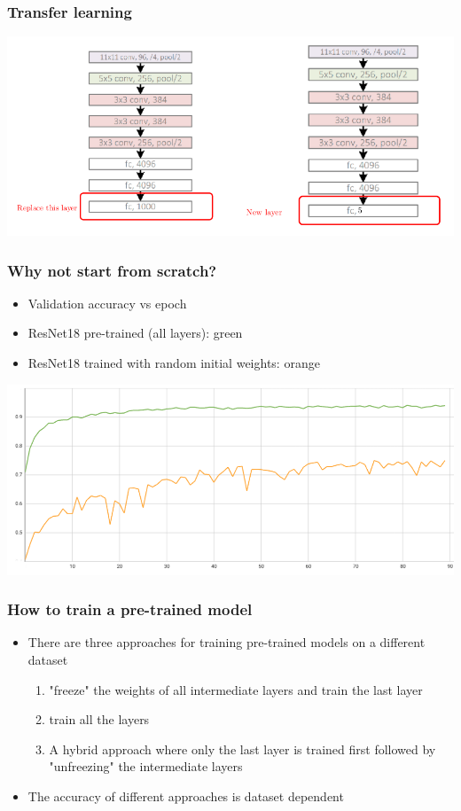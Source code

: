 \documentclass{beamer}
\begin{document}
\begin{frame}
    \frametitle{Transfer learning}
\begin{center}
    \includegraphics[width=\textwidth]{figs/transfer-fig4.png}
\end{center}
\end{frame}

\begin{frame}
    \frametitle{Why not start from scratch?}
    \begin{itemize}
        \item Validation accuracy vs epoch
        \item ResNet18 pre-trained (all layers): green
        \item ResNet18 trained with random initial weights: orange
    \end{itemize}
\begin{center}
    \includegraphics[width=\textwidth]{figs/pre-vs-scratch.png}
\end{center}
\end{frame}

\begin{frame}
    \frametitle{How to train a pre-trained model}
\begin{itemize}
    \item There are three approaches for training pre-trained models on a different dataset
    \begin{enumerate}
        \item "freeze" the weights of all intermediate layers and train the last layer
        \item train all the layers
        \item A hybrid approach where only the last layer is trained first followed by "unfreezing" the intermediate  layers
    \end{enumerate}
    \item The accuracy of different approaches is dataset dependent
\end{itemize}
    

\end{frame}
\end{document}
